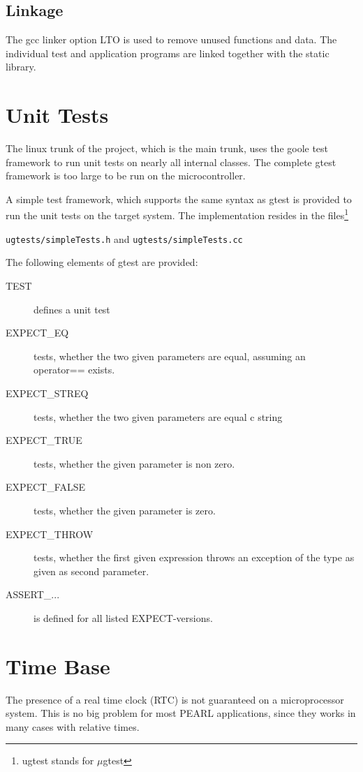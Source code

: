 \subsection{Linkage}
The gcc linker option LTO is used to remove unused functions and data. 
The individual test and application programs are linked together with 
the static library.

\section{Unit Tests}
The linux trunk of the project, which is the main trunk, uses the
goole test framework to run unit tests on nearly all internal classes.
The complete gtest framework is too large to be run on the microcontroller.

A simple test framework, which supports the same syntax as gtest is provided
to run the unit tests on the target system.
The implementation resides in the files\footnote{ugtest stands for $\mu$gtest}

 \verb|ugtests/simpleTests.h| and 
 \verb|ugtests/simpleTests.cc| 

The following elements of gtest are provided:
\begin{description}
\item[TEST] defines a unit test
\item[EXPECT\_EQ] tests, whether the two given parameters are equal, 
   assuming an operator== exists.
\item[EXPECT\_STREQ] tests, whether the two given parameters are equal c string 
\item[EXPECT\_TRUE] tests, whether the  given parameter is non zero. 
\item[EXPECT\_FALSE] tests, whether the  given parameter is zero. 
\item[EXPECT\_THROW] tests, whether the first given expression throws
   an exception of the type as given as  second parameter.
\item[ASSERT\_...] is defined for all listed EXPECT-versions. 
\end{description}

\section{Time Base}
The presence of a real time clock (RTC) is not guaranteed on a
microprocessor system.
This is no big problem for most PEARL applications, since they works 
in many cases with relative times.

